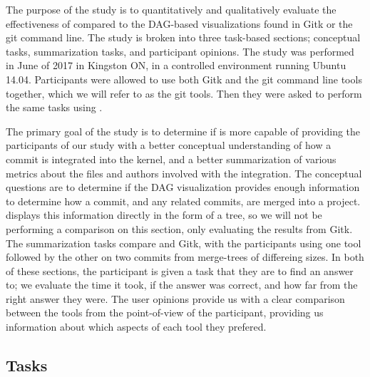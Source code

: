 The purpose of the study is to quantitatively and qualitatively evaluate
the effectiveness of \tool compared to the DAG-based visualizations
found in Gitk or the git command line. The study is broken into three
task-based sections; conceptual tasks, summarization tasks, and
participant opinions. The study was performed in June of 2017 in
Kingston ON, in a controlled environment running Ubuntu 14.04.
Participants were allowed to use both Gitk and the git command line
tools together, which we will refer to as the git tools. Then they were
asked to perform the same tasks using \tool.


The primary goal of the study is to determine if \tool is more capable
of providing the participants of our study with a better conceptual
understanding of how a commit is integrated into the kernel, and a
better summarization of various metrics about the files and authors
involved with the integration. The conceptual questions are to determine
if the DAG visualization provides enough information to determine how a
commit, and any related commits, are merged into a project. \tool
displays this information directly in the form of a tree, so we will not
be performing a comparison on this section, only evaluating the results
from Gitk. The summarization tasks compare \tool and Gitk, with the
participants using one tool followed by the other on two commits from
merge-trees of differeing sizes. In both of these sections, the
participant is given a task that they are to find an answer to; we
evaluate the time it took, if the answer was correct, and how far from
the right answer they were. The user opinions provide us with a clear
comparison between the tools from the point-of-view of the participant,
providing us information about which aspects of each tool they prefered.


\subsection{Tasks}
\label{sub:tasks}


